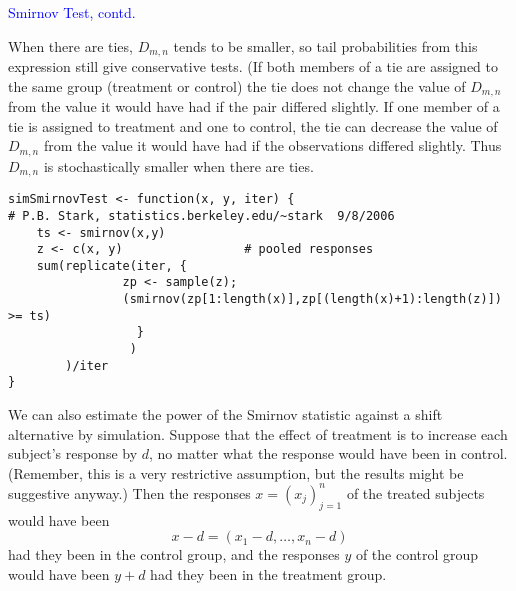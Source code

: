 \documentclass[landscape]{slides}
\newcommand{\beq}{\begin{equation}}
\newcommand{\eeq}{\end{equation}}
\begin{document}
\begin{slide}
\begin{slide}
\end{slide}

\begin{slide}
{\textcolor{blue}{Smirnov Test, contd.}}

    When there are ties, $D_{m,n}$ tends to
    be smaller, so tail probabilities from this expression still give conservative
    tests.
    (If both members of a tie are assigned to the same group (treatment or control)
    the tie does not change the value of $D_{m,n}$
    from the value it would have had if the pair differed slightly. 
    If one member of a tie is assigned to treatment and one to control, the tie 
    can decrease the value of $D_{m,n}$ from the 
    value it would have had if the observations differed slightly. 
    Thus 
    $D_{m,n}$ is stochastically smaller when there are ties.
\end{slide}

\begin{slide}

\begin{verbatim}
simSmirnovTest <- function(x, y, iter) {
# P.B. Stark, statistics.berkeley.edu/~stark  9/8/2006
    ts <- smirnov(x,y)
    z <- c(x, y)                 # pooled responses
    sum(replicate(iter, {
                zp <- sample(z);
                (smirnov(zp[1:length(x)],zp[(length(x)+1):length(z)]) >= ts)
                  }
                 )
        )/iter
}
\end{verbatim}

\end{slide}

\begin{slide}

    We can also estimate the power of the Smirnov statistic against a shift alternative
    by simulation.
    Suppose that the effect of treatment is to increase each subject's response by $d$,
    no matter what the response would have been in control.
    (Remember, this is a very restrictive assumption, but the results might be suggestive anyway.)
    Then the responses $x = (x_j)_{j=1}^n$
        of the treated subjects would have been
\beq
    x - d =(x_1 - d, \ldots, x_n - d)
\eeq
    had they been in the control group, and the responses $y$ of the control group would
    have been $y + d$ had they been in the treatment group.


\end{slide}
\end{slide}
\end{document}
